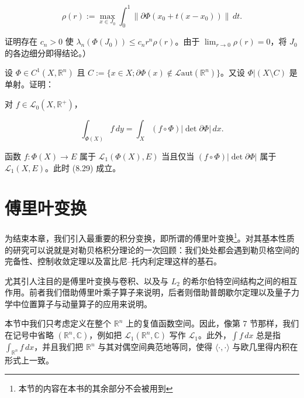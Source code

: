 \begin{exercises}
\[
\rho(r):=\max_{x\in J_0}\int_0^1\|\partial\Phi(x_0+t(x-x_0))\|\,dt .
\]

证明存在 $ c_n>0 $ 使 $ \lambda_n(\Phi(J_0))\le c_n r^n\rho(r) $。由于 $ \lim_{r\to 0}\rho(r)=0 $，将 $ J_0 $ 的各边细分即得结论。）

\item

设 $ \Phi\in C^1(X,\mathbb{R}^n) $ 且 $ C:=\{x\in X ; \partial\Phi(x)\notin\mathcal{L}\mathrm{aut}(\mathbb{R}^n)\} $。又设 $ \Phi|(X\setminus C) $ 是单射。证明：

\begin{subitems}
\item

对 $ f\in\mathcal{L}_0(X,\mathbb{R}^+) $，

\begin{equation}
\int_{\Phi(X)} f\,dy=\int_X (f\circ\Phi)|\det\partial\Phi|\,dx .\tag{8.29}
\end{equation}
\item

函数 $ f:\Phi(X)\to E $ 属于 $ \mathcal{L}_1(\Phi(X),E) $ 当且仅当 $ (f\circ\Phi)|\det\partial\Phi| $ 属于 $ \mathcal{L}_1(X,E) $。此时 (8.29) 成立。

\end{subitems}

\end{exercises}

\section{傅里叶变换}

为结束本章，我们引入最重要的积分变换，即所谓的傅里叶变换\footnote{本节的内容在本书的其余部分不会被用到}。对其基本性质的研究可以说就是对勒贝格积分理论的一次回顾：我们处处都会遇到勒贝格空间的完备性、控制收敛定理以及富比尼–托内利定理这样的基石。

尤其引人注目的是傅里叶变换与卷积、以及与 $ L_2 $ 的希尔伯特空间结构之间的相互作用。前者我们借助傅里叶乘子算子来说明，后者则借助普朗歇尔定理以及量子力学中位置算子与动量算子的应用来说明。

本节中我们只考虑定义在整个 $ \mathbb{R}^n $ 上的复值函数空间。因此，像第 7 节那样，我们在记号中省略 $ (\mathbb{R}^n,\mathbb{C}) $，例如把 $ \mathcal{L}_1(\mathbb{R}^n,\mathbb{C}) $ 写作 $ \mathcal{L}_1 $。此外，$ \int f\,dx $ 总是指 $ \int_{\mathbb{R}^n} f\,dx $，并且我们把 $ \mathbb{R}^n $ 与其对偶空间典范地等同，使得 $ \langle\cdot,\cdot\rangle $ 与欧几里得内积在形式上一致。

